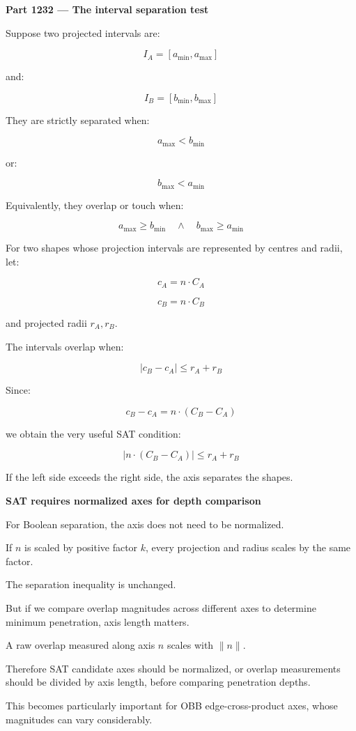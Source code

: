 \textbf{Part 1232 --- The interval separation test}

Suppose two projected intervals are:

\[
I_A=[a_{\min},a_{\max}]
\]

and:

\[
I_B=[b_{\min},b_{\max}]
\]

They are strictly separated when:

\[
\boxed{ a_{\max}<b_{\min} }
\]

or:

\[
\boxed{ b_{\max}<a_{\min} }
\]

Equivalently, they overlap or touch when:

\[
\boxed{ a_{\max}\ge b_{\min} \quad\land\quad b_{\max}\ge a_{\min} }
\]

For two shapes whose projection intervals are represented by centres and radii, let:

\[
c_A=n\cdot C_A
\]

\[
c_B=n\cdot C_B
\]

and projected radii \(r_A,r_B\).

The intervals overlap when:

\[
\boxed{ |c_B-c_A|\le r_A+r_B }
\]

Since:

\[
c_B-c_A=n\cdot(C_B-C_A)
\]

we obtain the very useful SAT condition:

\[
\boxed{ |n\cdot(C_B-C_A)|\le r_A+r_B }
\]

If the left side exceeds the right side, the axis separates the shapes.

\textbf{SAT requires normalized axes for depth comparison}

For Boolean separation, the axis does not need to be normalized.

If \(n\) is scaled by positive factor \(k\), every projection and radius scales by the same factor.

The separation inequality is unchanged.

But if we compare overlap magnitudes across different axes to determine minimum penetration, axis length matters.

A raw overlap measured along axis \(n\) scales with \(\|n\|\).

Therefore SAT candidate axes should be normalized, or overlap measurements should be divided by axis length, before comparing penetration depths.

This becomes particularly important for OBB edge-cross-product axes, whose magnitudes can vary considerably.

